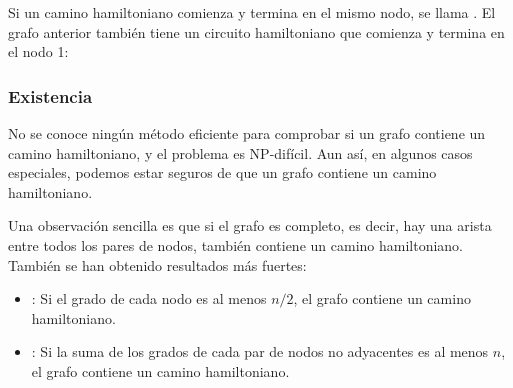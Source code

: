 Si un camino hamiltoniano comienza y termina en el mismo nodo,
se llama .
El grafo anterior también tiene un circuito hamiltoniano
que comienza y termina en el nodo 1:
\begin{center}
\end{center}

\subsubsection{Existencia}

No se conoce ningún método eficiente para comprobar si un grafo
contiene un camino hamiltoniano, y el problema es NP-difícil.
Aun así, en algunos casos especiales, podemos estar seguros
de que un grafo contiene un camino hamiltoniano.

Una observación sencilla es que si el grafo es completo,
es decir, hay una arista entre todos los pares de nodos,
también contiene un camino hamiltoniano.
También se han obtenido resultados más fuertes:

\begin{itemize}
\item
{}
: %
Si el grado de cada nodo es al menos $n/2$,
el grafo contiene un camino hamiltoniano.
\item
{}
: %
Si la suma de los grados de cada par de nodos no adyacentes
es al menos $n$,
el grafo contiene un camino hamiltoniano.
\end{itemize}

